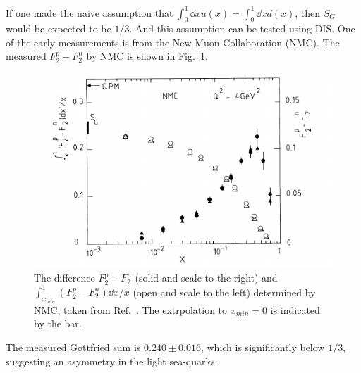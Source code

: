If one made the naive assumption that $\int_0^1\dd{x} \bar{u}\left(x\right)=\int_0^1\dd{x} \bar{d}\left(x\right)$,
then $S_G$ would be expected to be $1/3$. And this assumption can be tested using DIS.
One of the early measurements is from the New Muon Collaboration (NMC)\cite{amaudruz1991}. 
The measured $F_2^p-F_2^n$ by NMC is shown in Fig.\ \ref{fig:NMC_Gottfried}. 
\begin{figure}[htbp!]
	\centering
	\includegraphics[width=0.7\linewidth]{images/Gottfried}
	\caption{The difference $F_2^p -F_2^n$ (solid and scale to the right) and 
		$\int_{x_{min}}^1 (F_2^p-F_2^n)\dd{x}/x$ (open and scale to the left) 
		determined by NMC, taken from Ref.\ \cite{amaudruz1991}. The extrpolation
		to $x_{min}=0$ is indicated by the bar.}
	\label{fig:NMC_Gottfried}
\end{figure}
The measured Gottfried sum is $0.240 \pm 0.016$, which is significantly below 
$1/3$, suggesting an asymmetry in the light sea-quarks.


